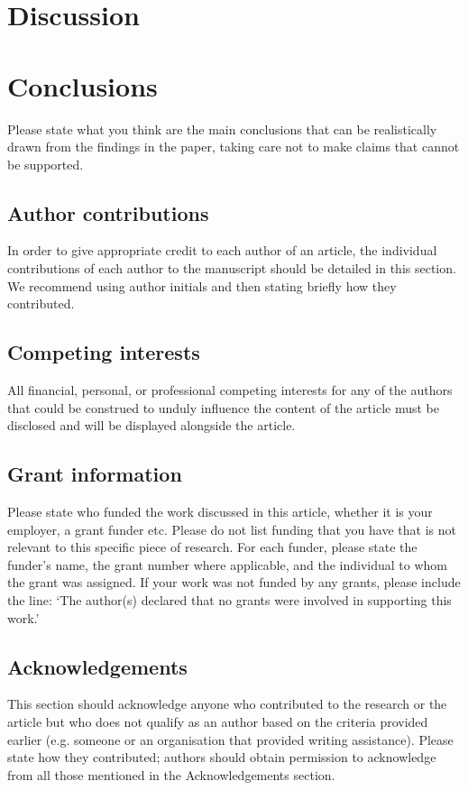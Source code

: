 \documentclass[10pt,a4paper,twocolumn]{article}
\begin{document}
\section*{Discussion}




\section*{Conclusions}
Please state what you think are the main conclusions that can be realistically drawn from the findings in the paper, taking care not to make claims that cannot be supported.



\subsection*{Author contributions}
In order to give appropriate credit to each author of an article, the individual
contributions of each author to the manuscript should be detailed in this section. We
recommend using author initials and then stating briefly how they contributed.

\subsection*{Competing interests}
All financial, personal, or professional competing interests for any of the authors that
could be construed to unduly influence the content of the article must be disclosed and
will be displayed alongside the article.

\subsection*{Grant information}
Please state who funded the work discussed in this article, whether it is your employer,
a grant funder etc. Please do not list funding that you have that is not relevant to this
specific piece of research. For each funder, please state the funder’s name, the grant
number where applicable, and the individual to whom the grant was assigned.
If your work was not funded by any grants, please include the line: ‘The author(s)
declared that no grants were involved in supporting this work.’

\subsection*{Acknowledgements}
This section should acknowledge anyone who contributed to the research or the
article but who does not qualify as an author based on the criteria provided earlier
(e.g. someone or an organisation that provided writing assistance). Please state how
they contributed; authors should obtain permission to acknowledge from all those
mentioned in the Acknowledgements section.
\end{document}
